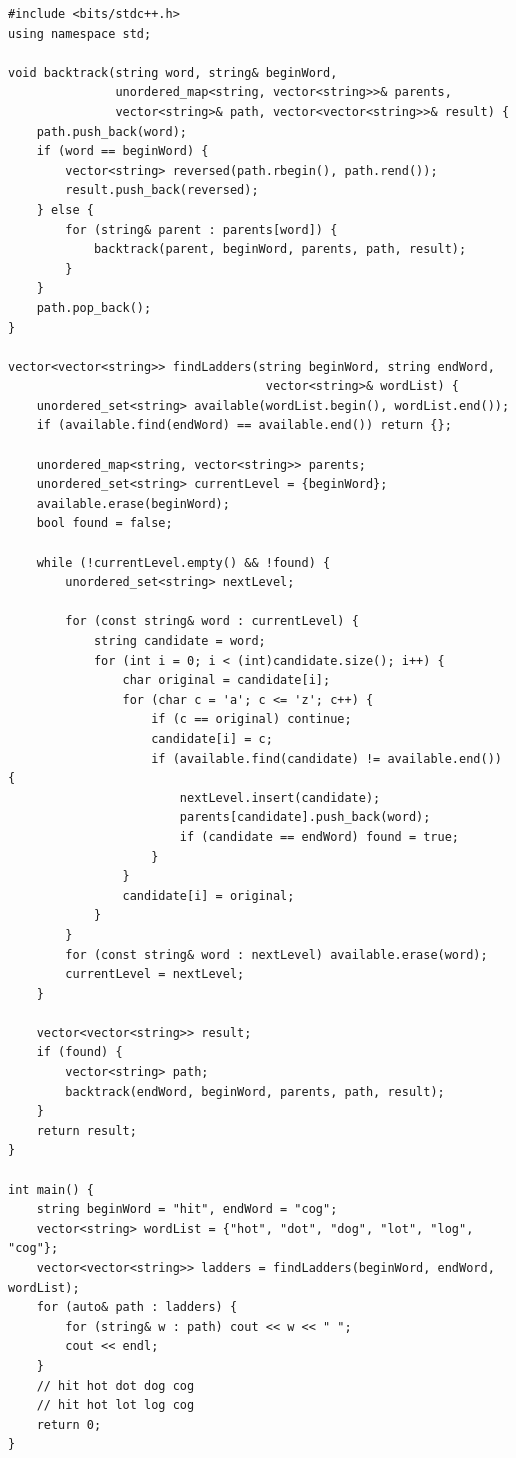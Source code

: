 \begin{lstlisting}
#include <bits/stdc++.h>
using namespace std;

void backtrack(string word, string& beginWord,
               unordered_map<string, vector<string>>& parents,
               vector<string>& path, vector<vector<string>>& result) {
    path.push_back(word);
    if (word == beginWord) {
        vector<string> reversed(path.rbegin(), path.rend());
        result.push_back(reversed);
    } else {
        for (string& parent : parents[word]) {
            backtrack(parent, beginWord, parents, path, result);
        }
    }
    path.pop_back();
}

vector<vector<string>> findLadders(string beginWord, string endWord,
                                    vector<string>& wordList) {
    unordered_set<string> available(wordList.begin(), wordList.end());
    if (available.find(endWord) == available.end()) return {};

    unordered_map<string, vector<string>> parents;
    unordered_set<string> currentLevel = {beginWord};
    available.erase(beginWord);
    bool found = false;

    while (!currentLevel.empty() && !found) {
        unordered_set<string> nextLevel;

        for (const string& word : currentLevel) {
            string candidate = word;
            for (int i = 0; i < (int)candidate.size(); i++) {
                char original = candidate[i];
                for (char c = 'a'; c <= 'z'; c++) {
                    if (c == original) continue;
                    candidate[i] = c;
                    if (available.find(candidate) != available.end()) {
                        nextLevel.insert(candidate);
                        parents[candidate].push_back(word);
                        if (candidate == endWord) found = true;
                    }
                }
                candidate[i] = original;
            }
        }
        for (const string& word : nextLevel) available.erase(word);
        currentLevel = nextLevel;
    }

    vector<vector<string>> result;
    if (found) {
        vector<string> path;
        backtrack(endWord, beginWord, parents, path, result);
    }
    return result;
}

int main() {
    string beginWord = "hit", endWord = "cog";
    vector<string> wordList = {"hot", "dot", "dog", "lot", "log", "cog"};
    vector<vector<string>> ladders = findLadders(beginWord, endWord, wordList);
    for (auto& path : ladders) {
        for (string& w : path) cout << w << " ";
        cout << endl;
    }
    // hit hot dot dog cog
    // hit hot lot log cog
    return 0;
}
\end{lstlisting}

